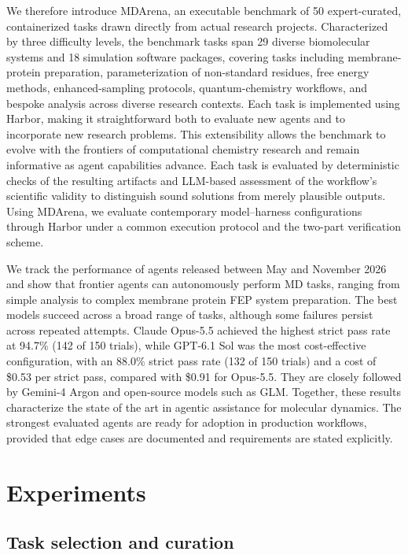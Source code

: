 We therefore introduce MDArena, an executable benchmark of 50 expert-curated, containerized tasks drawn directly from actual research projects. Characterized by three difficulty levels, the benchmark tasks span 29 diverse biomolecular systems and 18 simulation software packages, covering tasks including membrane-protein preparation, parameterization of non-standard residues, free energy methods, enhanced-sampling protocols, quantum-chemistry workflows, and bespoke analysis across diverse research contexts. Each task is implemented using Harbor,\cite{Harbor_Framework} making it straightforward both to evaluate new agents and to incorporate new research problems. This extensibility allows the benchmark to evolve with the frontiers of computational chemistry research and remain informative as agent capabilities advance. Each task is evaluated by deterministic checks of the resulting artifacts and LLM-based assessment of the workflow’s scientific validity to distinguish sound solutions from merely plausible outputs. Using MDArena, we evaluate contemporary model–harness configurations through Harbor\cite{Harbor_Framework} under a common execution protocol and the two-part verification scheme.


We track the performance of agents released between May and November 2026 and show that frontier agents can autonomously perform MD tasks, ranging from simple analysis to complex membrane protein FEP system preparation. The best models succeed across a broad range of tasks, although some failures persist across repeated attempts. Claude Opus-5.5 achieved the highest strict pass rate at 94.7\% (142 of 150 trials), while GPT-6.1 Sol was the most cost-effective configuration, with an 88.0\% strict pass rate (132 of 150 trials) and a cost of \$0.53 per strict pass, compared with \$0.91 for Opus-5.5. They are closely followed by Gemini-4 Argon and open-source models such as GLM. Together, these results characterize the state of the art in agentic assistance for molecular dynamics. The strongest evaluated agents are ready for adoption in production workflows, provided that edge cases are documented and requirements are stated explicitly.



\section{Experiments}

\subsection{Task selection and curation}

